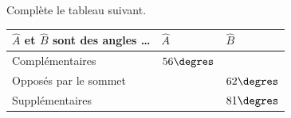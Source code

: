 %
%
Complète le tableau suivant.
    \begin{center}
        \begin{tabularx}{.8\linewidth}{|l|*{2}{Y|}}
            \hline
            $\widehat{A}$ et $\widehat{B}$ sont des angles \dots & $\widehat{A}$ & $\widehat{B}$ \\
            \hline
            Complémentaires                                      & $56\degres$   &               \\
            \hline
            Opposés par le sommet                                &               & $62\degres$   \\
            \hline
            Supplémentaires                                      &               & $81\degres$   \\
            \hline
        \end{tabularx}
    \end{center}


